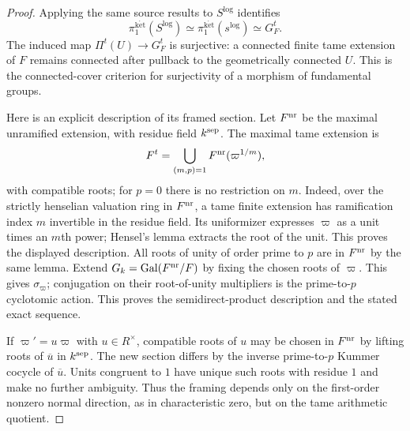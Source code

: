 \begin{proof}
Applying the same source results to $S^{\log}$ identifies
\[
 \pi_1^{\mathrm{k\acute et}}(S^{\log})
 \simeq\pi_1^{\mathrm{k\acute et}}(s^{\log})
 \simeq G_F^t.
\]
The induced map $\Pi^t(U)\to G_F^t$ is surjective: a connected finite
tame extension of $F$ remains connected after pullback to the
geometrically connected $U$. This is the connected-cover criterion
for surjectivity of a morphism of fundamental groups.

Here is an explicit description of its framed section. Let $F^{\rm nr}$
be the maximal unramified extension, with residue field $k^{\rm sep}$.
The maximal tame extension is
\[
 F^t=\bigcup_{(m,p)=1}F^{\rm nr}(\varpi^{1/m}),
\]
with compatible roots; for $p=0$ there is no restriction on $m$.
Indeed, over the strictly henselian valuation ring in $F^{\rm nr}$,
a tame finite extension has ramification index $m$ invertible in the
residue field. Its uniformizer expresses $\varpi$ as a unit times an
$m$th power; Hensel's lemma extracts the root of the unit. This proves
the displayed description. All roots of unity of order prime to $p$
are in $F^{\rm nr}$ by the same lemma. Extend $G_k=\operatorname{Gal}
(F^{\rm nr}/F)$ by fixing the chosen roots of $\varpi$. This gives
$\sigma_{\varpi}$; conjugation on their root-of-unity multipliers is
the prime-to-$p$ cyclotomic action. This proves the semidirect-product
description and the stated exact sequence.

If $\varpi'=u\varpi$ with $u\in R^\times$, compatible roots of $u$
may be chosen in $F^{\rm nr}$ by lifting roots of $\overline u$ in
$k^{\rm sep}$. The new section differs by the inverse prime-to-$p$
Kummer cocycle of $\overline u$. Units congruent to $1$ have unique
such roots with residue $1$ and make no further ambiguity. Thus the
framing depends only on the first-order nonzero normal direction,
as in characteristic zero, but on the tame arithmetic quotient.
\end{proof}

